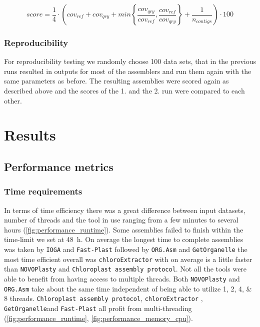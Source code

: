 \documentclass{bmcart}
\newcommand{\formatprogramnames}[1]{\texttt{#1}}
\newcommand{\ce}{\formatprogramnames{chloroExtractor}}
\newcommand{\oa}{\formatprogramnames{ORG.Asm}}
\newcommand{\fp}{\formatprogramnames{Fast-Plast}}
\newcommand{\ioga}{\formatprogramnames{IOGA}}
\newcommand{\np}{\formatprogramnames{NOVOPlasty}}
\newcommand{\go}{\formatprogramnames{GetOrganelle}}
\newcommand{\cassp}{\formatprogramnames{Chloroplast assembly protocol}}
\begin{document}
\begin{equation}
   score = \frac{1}{4} \cdot \left( cov_{ref} +  cov_{qry} + min\left\{ \frac{cov_{qry}}{cov_{ref}}, \frac{cov_{ref}}{cov_{qry}}\right\} + \frac{1}{n_{contigs} }\right) \cdot 100 
   \label{eq:quantitative}
\end{equation}



\subsubsection*{Reproducibility}
For reproducibility  testing we randomly choose  \num{100} data sets, that in the previous runs resulted in outputs for most of the assemblers and run them again with the same parameters as before. The resulting assemblies were scored again as described above and the scores of the 1. and the 2. run were compared to each other. 

\section*{Results}
\subsection*{Performance metrics}

\subsubsection*{Time requirements}
In terms of time efficiency there was a great difference between input datasets, number of threads and the tool in use ranging from a few minutes to several hours (\cref{fig:performance_runtime}).
Some assemblies failed to finish within the time-limit we set at \SI{48}{\hour}. 
On average the longest time to complete assemblies was taken by \ioga{} and \fp{} followed by \oa{} and \go{} the most time efficient overall was \ce{} with on average is a little faster than \np{} and \cassp{}.
Not all the tools were able to benefit from having access to multiple threads. Both \np{} and \oa{} take about the same time independent of being able to utilize \numlist[list-final-separator={, or }]{1;2;4;8} threads. \cassp{}, \ce{} , \go and \fp{} all profit from multi-threading (\cref{fig:performance_runtime}, \cref{fig:performance_memory_cpu}).
\end{document}
